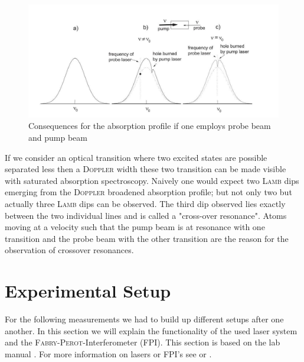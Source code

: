 \documentclass[11pt,a4paper,notitlepage]{scrartcl}
\begin{document}
\begin{figure}[htbp]
	\centering
	\includegraphics[width=.8\linewidth]{figs/experimental_setup/bennet.jpg}
	\caption{Consequences for the absorption profile if one employs probe beam and pump beam \cite{manual}}
	\label{fig:bennet}
\end{figure}

If we consider an optical transition where two excited states are possible separated less then a \textsc{Doppler} width these two transition can be made visible with saturated absorption spectroscopy. Naively one would expect two \textsc{Lamb} dips emerging from the \textsc{Doppler} broadened absorption profile; but not only two but actually three \textsc{Lamb} dips can be observed. The third dip observed lies exactly between the two individual lines and is called a "cross-over resonance". Atoms moving at a velocity such that the pump beam is at resonance with one transition and the probe beam with the other transition are the reason for the observation of crossover resonances. \cite{manual}


\section{Experimental Setup}
\label{sec:exp}
For the following measurements we had to build up different setups after one another. In this section we will explain the functionality of the used laser system and the \textsc{Fabry-Perot}-Interferometer (FPI). This section is based on the lab manual \cite{manual}. For more information on lasers or FPI's see \cite{laser} or \cite{}.
\end{document}
